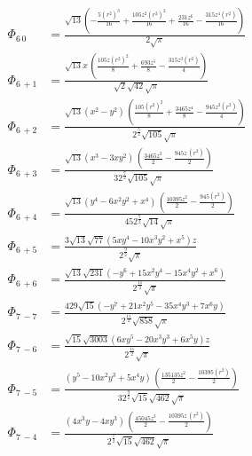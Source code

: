 \documentclass[10pt]{article}
\begin{document}
\begin{align*}
    \Phi_{6\, 0} &= \frac{\sqrt{13} \left( -\frac{5 {{\left( r^2\right) }^{3}}}{16}+\frac{105 {{z}^{2}} {{\left( r^2\right) }^{2}}}{16}+\frac{231 {{z}^{6}}}{16}-\frac{315 {{z}^{4}} \left( r^2\right) }{16}\right) }{2 \sqrt{\ensuremath{\pi} }} \\
    \Phi_{6\, +1} &= \frac{\sqrt{13} x\, \left( \frac{105 z {{\left( r^2\right) }^{2}}}{8}+\frac{693 {{z}^{5}}}{8}-\frac{315 {{z}^{3}} \left( r^2\right) }{4}\right) }{\sqrt{2} \sqrt{42} \sqrt{\ensuremath{\pi} }} \\
    \Phi_{6\, +2} &= \frac{\sqrt{13} \left( {{x}^{2}}-{{y}^{2}}\right) \, \left( \frac{105 {{\left( r^2\right) }^{2}}}{8}+\frac{3465 {{z}^{4}}}{8}-\frac{945 {{z}^{2}} \left( r^2\right) }{4}\right) }{{{2}^{\frac{5}{2}}} \sqrt{105} \sqrt{\ensuremath{\pi} }} \\
    \Phi_{6\, +3} &= \frac{\sqrt{13} \left( {{x}^{3}}-3 x {{y}^{2}}\right) \, \left( \frac{3465 {{z}^{3}}}{2}-\frac{945 z\, \left( r^2\right) }{2}\right) }{3 {{2}^{\frac{7}{2}}} \sqrt{105} \sqrt{\ensuremath{\pi} }} \\
    \Phi_{6\, +4} &= \frac{\sqrt{13} \left( {{y}^{4}}-6 {{x}^{2}} {{y}^{2}}+{{x}^{4}}\right) \, \left( \frac{10395 {{z}^{2}}}{2}-\frac{945 \left( r^2\right) }{2}\right) }{45 {{2}^{\frac{7}{2}}} \sqrt{14} \sqrt{\ensuremath{\pi} }} \\
    \Phi_{6\, +5} &= \frac{3 \sqrt{13} \sqrt{77} \left( 5 x {{y}^{4}}-10 {{x}^{3}} {{y}^{2}}+{{x}^{5}}\right)  z}{{{2}^{\frac{9}{2}}} \sqrt{\ensuremath{\pi} }} \\
    \Phi_{6\, +6} &= \frac{\sqrt{13} \sqrt{231} \left( -{{y}^{6}}+15 {{x}^{2}} {{y}^{4}}-15 {{x}^{4}} {{y}^{2}}+{{x}^{6}}\right) }{{{2}^{\frac{11}{2}}} \sqrt{\ensuremath{\pi} }} \\
%
    \Phi_{7\, -7} &= \frac{429 \sqrt{15} \left( -{{y}^{7}}+21 {{x}^{2}} {{y}^{5}}-35 {{x}^{4}} {{y}^{3}}+7 {{x}^{6}} y\right) }{{{2}^{\frac{11}{2}}} \sqrt{858} \sqrt{\ensuremath{\pi} }} \\
    \Phi_{7\, -6} &= \frac{\sqrt{15} \sqrt{3003} \left( 6 x {{y}^{5}}-20 {{x}^{3}} {{y}^{3}}+6 {{x}^{5}} y\right)  z}{{{2}^{\frac{11}{2}}} \sqrt{\ensuremath{\pi} }} \\
    \Phi_{7\, -5} &= \frac{\left( {{y}^{5}}-10 {{x}^{2}} {{y}^{3}}+5 {{x}^{4}} y\right) \, \left( \frac{135135 {{z}^{2}}}{2}-\frac{10395 \left( r^2\right) }{2}\right) }{3 {{2}^{\frac{9}{2}}} \sqrt{15} \sqrt{462} \sqrt{\ensuremath{\pi} }} \\
    \Phi_{7\, -4} &= \frac{\left( 4 {{x}^{3}} y-4 x {{y}^{3}}\right) \, \left( \frac{45045 {{z}^{3}}}{2}-\frac{10395 z\, \left( r^2\right) }{2}\right) }{{{2}^{\frac{7}{2}}} \sqrt{15} \sqrt{462} \sqrt{\ensuremath{\pi} }} \\

\end{align*}
\end{document}
